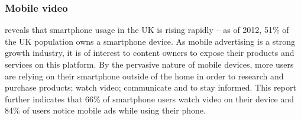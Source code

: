 



	\subsubsection{Mobile video}

		\citet{mobile-planet} reveals that smartphone usage in the UK is rising rapidly -- as of 2012, 51\% of the UK population owns a smartphone device. As mobile advertising is a strong growth industry, it is of interest to content owners to expose their products and services on this platform. By the pervasive nature of mobile devices, more users are relying on their smartphone outside of the home in order to research and purchase products; watch video; communicate and to stay informed. This report further indicates that 66\% of smartphone users watch video on their device and 84\% of users notice mobile ads while using their phone. 

